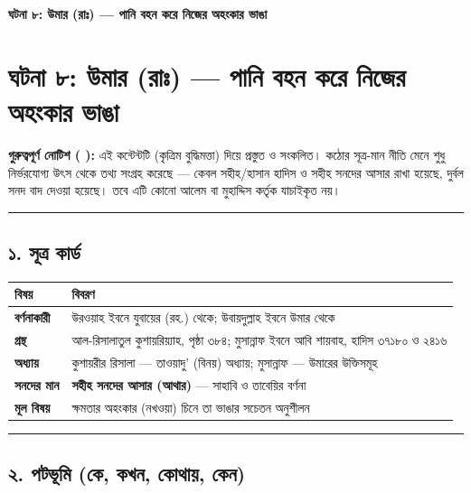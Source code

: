 

\begin{center}{\Large\bfseries\color{emerald} ঘটনা ৮: উমার (রাঃ) — পানি বহন করে নিজের অহংকার ভাঙা}\end{center}
\vspace{1em}
\section*{ঘটনা ৮: উমার (রাঃ) — পানি বহন করে নিজের অহংকার ভাঙা}

\begin{warnbox}
 \textbf{গুরুত্বপূর্ণ নোটিশ ( ):} এই কন্টেন্টটি  (কৃত্রিম বুদ্ধিমত্তা) দিয়ে প্রস্তুত ও সংকলিত।  কঠোর সূত্র-মান নীতি মেনে শুধু নির্ভরযোগ্য উৎস থেকে তথ্য সংগ্রহ করেছে — কেবল সহীহ/হাসান হাদিস ও সহীহ সনদের আসার রাখা হয়েছে, দুর্বল সনদ বাদ দেওয়া হয়েছে। তবে এটি কোনো আলেম বা মুহাদ্দিস কর্তৃক যাচাইকৃত নয়।
\end{warnbox}


\medskip\hrule\medskip

\subsection*{১. সূত্র কার্ড}

\begin{table}[h]\centering\small
\begin{tabular}{ll}
বিষয় & বিবরণ \\
\hline
\textbf{বর্ণনাকারী} & উরওয়াহ ইবনে যুবায়ের (রহ.) থেকে; উবায়দুল্লাহ ইবনে উমার থেকে \\
\textbf{গ্রন্থ} & আল-রিসালাতুল কুশায়রিয়্যাহ, পৃষ্ঠা ৩৮৪; মুসান্নাফ ইবনে আবি শায়বাহ, হাদিস ৩৭১৮০ ও ২৪১৬ \\
\textbf{অধ্যায়} & কুশায়রীর রিসালা — তাওয়াদু' (বিনয়) অধ্যায়; মুসান্নাফ — উমারের উক্তিসমূহ \\
\textbf{সনদের মান} & \textbf{সহীহ সনদের আসার (আথার)} — সাহাবি ও তাবেয়ির বর্ণনা \\
\textbf{মূল বিষয়} & ক্ষমতার অহংকার (নখওয়া) চিনে তা ভাঙার সচেতন অনুশীলন \\
\hline
\end{tabular}
\end{table}

\medskip\hrule\medskip

\subsection*{২. পটভূমি (কে, কখন, কোথায়, কেন)}

